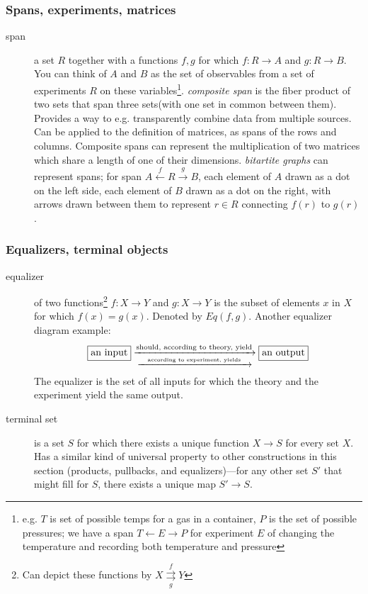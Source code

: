 \documentclass{article}
\begin{document}
\subsubsection{Spans, experiments, matrices}
\begin{description}
\item[span] a set $R$ together with a functions $f, g$ for which $f: R \rightarrow A$ and $g: R \rightarrow B$. You can think of $A$ and $B$ as the set of observables from a set of experiments $R$ on these variables\footnote{e.g. $T$ is set of possible temps for a gas in a container, $P$ is the set of possible pressures; we have a span $T \leftarrow E \rightarrow P$ for experiment $E$ of changing the temperature and recording both temperature and pressure}.
\emph{composite span} is the fiber product of two sets that span three sets(with one set in common between them). Provides a way to e.g. transparently combine data from multiple sources.
Can be applied to the definition of matrices, as spans of the rows and columns. Composite spans can represent the multiplication of two matrices which share a length of one of their dimensions.
\emph{bitartite graphs} can represent spans; for span $A \stackrel{f}{\leftarrow} R \stackrel{g}{\rightarrow} B$, each element of $A$ drawn as a dot on the left side, each element of $B$ drawn as a dot on the right, with arrows drawn between them to represent $r \in R$ connecting $f(r)$ to $g(r)$.
\end{description}

\subsubsection{Equalizers, terminal objects}
\begin{description}
\item[equalizer] of two functions\footnote{Can depict these functions by $X \underset{g}{\stackrel{f}{\rightrightarrows}} Y$} $f: X \rightarrow Y$ and $g: X \rightarrow Y$ is the subset of elements $x$ in $X$ for which $f(x) = g(x)$. Denoted by $Eq(f,g)$.
Another equalizer diagram example:
\begin{equation*}
\text{\fbox{an input}} \underset{\xrightarrow{\text{according to experiment, yields}}}{\xrightarrow{\text{should, according to theory, yield}}} \fbox{\text{an output}}
\end{equation*}
The equalizer is the set of all inputs for which the theory and the experiment yield the same output.
\item[terminal set] is a set $S$ for which there exists a unique function $X \rightarrow S$ for every set $X$. Has a similar kind of universal property to other constructions in this section (products, pullbacks, and equalizers)---for any other set $S'$ that might fill for $S$, there exists a unique map $S' \rightarrow S$.
\end{description}
\end{document}
